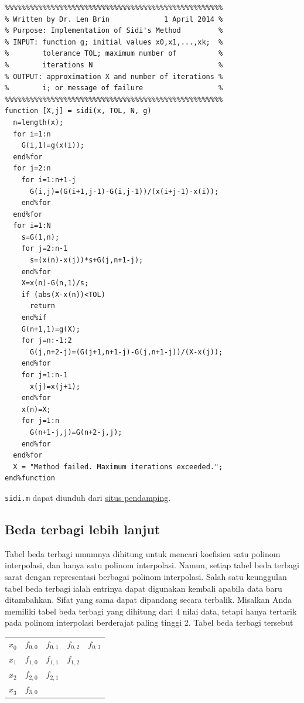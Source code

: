 \noindent\begin{verbatim}
%%%%%%%%%%%%%%%%%%%%%%%%%%%%%%%%%%%%%%%%%%%%%%%%%%%%
% Written by Dr. Len Brin             1 April 2014 %
% Purpose: Implementation of Sidi's Method         %
% INPUT: function g; initial values x0,x1,...,xk;  %
%        tolerance TOL; maximum number of          %
%        iterations N                              %
% OUTPUT: approximation X and number of iterations %
%        i; or message of failure                  %
%%%%%%%%%%%%%%%%%%%%%%%%%%%%%%%%%%%%%%%%%%%%%%%%%%%%
function [X,j] = sidi(x, TOL, N, g)
  n=length(x);
  for i=1:n
    G(i,1)=g(x(i));
  end%for
  for j=2:n
    for i=1:n+1-j
      G(i,j)=(G(i+1,j-1)-G(i,j-1))/(x(i+j-1)-x(i));
    end%for
  end%for
  for i=1:N
    s=G(1,n);
    for j=2:n-1
      s=(x(n)-x(j))*s+G(j,n+1-j);
    end%for
    X=x(n)-G(n,1)/s;
    if (abs(X-x(n))<TOL)
      return
    end%if
    G(n+1,1)=g(X);
    for j=n:-1:2
      G(j,n+2-j)=(G(j+1,n+1-j)-G(j,n+1-j))/(X-x(j));
    end%for
    for j=1:n-1
      x(j)=x(j+1);
    end%for
    x(n)=X;
    for j=1:n
      G(n+1-j,j)=G(n+2-j,j);
    end%for
  end%for
  X = "Method failed. Maximum iterations exceeded.";
end%function
\end{verbatim}\texttt{sidi.m} dapat diunduh dari \href{http://lqbrin.github.io/tea-time-numerical/ancillaries.html}{situs pendamping}.

\subsection{Beda terbagi lebih lanjut}

Tabel beda terbagi umumnya dihitung untuk mencari koefisien satu polinom
interpolasi, dan hanya satu polinom interpolasi. Namun, setiap tabel
beda terbagi sarat dengan representasi berbagai polinom interpolasi.
Salah satu keunggulan tabel beda terbagi ialah entrinya dapat digunakan
kembali apabila data baru ditambahkan. Sifat yang sama dapat dipandang
secara terbalik. Misalkan Anda memiliki tabel beda terbagi yang dihitung
dari 4 nilai data, tetapi hanya tertarik pada polinom interpolasi
berderajat paling tinggi 2. Tabel beda terbagi tersebut

\begin{center}
\begin{tabular}{c|cccc}
$x_{0}$ & $f_{0,0}$ & $f_{0,1}$ & $f_{0,2}$ & $f_{0,3}$\tabularnewline
$x_{1}$ & $f_{1,0}$ & $f_{1,1}$ & $f_{1,2}$ & \tabularnewline
$x_{2}$ & $f_{2,0}$ & $f_{2,1}$ &  & \tabularnewline
$x_{3}$ & $f_{3,0}$ &  &  & \tabularnewline
\end{tabular}
\par\end{center}

